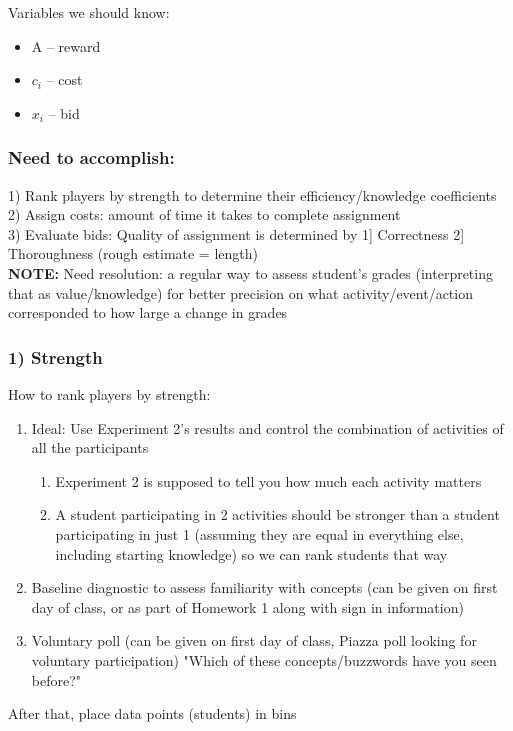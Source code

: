 \documentclass[leqno]{article}
\begin{document}
Variables we should know:
\begin{itemize}
\item A -- reward
\item $c_i$ -- cost
\item $x_i$ -- bid
\end{itemize}

\subsubsection*{Need to accomplish:}
1) Rank players by strength to determine their efficiency/knowledge coefficients\\
2) Assign costs: amount of time it takes to complete assignment\\
3) Evaluate bids: Quality of assignment is determined by 1] Correctness 2] Thoroughness (rough estimate = length)\\

\textbf{NOTE:} Need resolution: a regular way to assess student's grades (interpreting that as value/knowledge) for better precision on what activity/event/action corresponded to how large a change in grades

\subsubsection*{1) Strength}
How to rank players by strength:
\begin{enumerate}
\item Ideal: Use Experiment 2's results and control the combination of activities of all the participants
\begin{enumerate}
\item Experiment 2 is supposed to tell you how much each activity matters
\item A student participating in 2 activities should be stronger than a student participating in just 1 (assuming they are equal in everything else, including starting knowledge) so we can rank students that way
\end{enumerate}
\item Baseline diagnostic to assess familiarity with concepts (can be given on first day of class, or as part of Homework 1 along with sign in information)
\item Voluntary poll (can be given on first day of class, Piazza poll looking for voluntary participation) "Which of these concepts/buzzwords have you seen before?"
\end{enumerate}
After that, place data points (students) in bins\\
\end{document}
